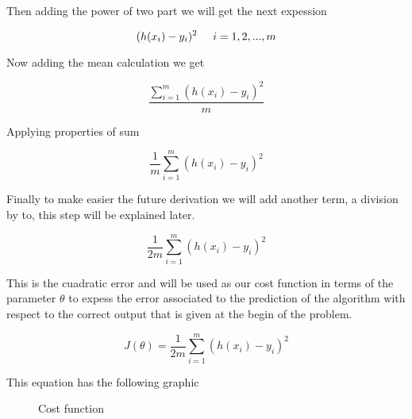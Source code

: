 \documentclass[12pt,journal]{IEEEtran}
\begin{document}
    Then adding the power of two part we will get the next expession

    \begin{equation}
        (h(x_i) - y_i)^2 \hspace{0.5cm} i=1, 2, ..., m
    \end{equation}

    Now adding the mean calculation we get

    \begin{equation}
        \frac{\sum_{i=1}^{m} (h(x_i) - y_i)^2}{m}
    \end{equation}

    Applying properties of sum

    \begin{equation}
       \frac{1}{m} \sum_{i=1}^{m} ( h(x_i) - y_i )^2
    \end{equation}

    Finally to make easier the future derivation we will add another term, a
    division by to, this step will be explained later.

    \begin{equation}
       \frac{1}{2m} \sum_{i=1}^{m} ( h(x_i) - y_i )^2
    \end{equation}

    This is the cuadratic error and will be used as our cost function in terms
    of the parameter $\theta$ to expess the error associated to the prediction
    of the algorithm with respect to the correct output that is given at the
    begin of the problem.

    \begin{equation}
       J(\theta) = \frac{1}{2m} \sum_{i=1}^{m} ( h(x_i) - y_i )^2
    \end{equation}

    This equation has the following graphic

    \begin{figure}[h!]

        \centering
        \captionsetup{justification=centering}


        \caption{Cost function}
    \end{figure}
\end{document}
